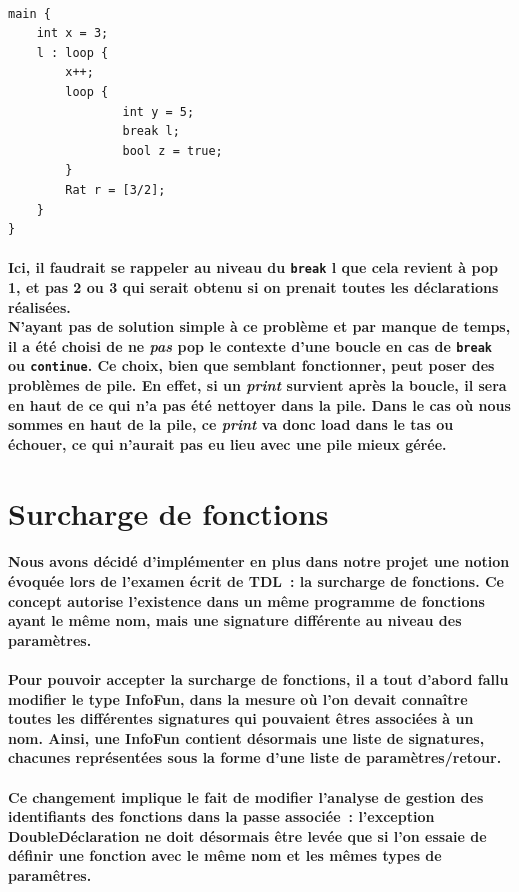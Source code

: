 \documentclass[french]{article}
\begin{document}
\, %
\begin{lstlisting}[language=ratcode]
main {
    int x = 3;
    l : loop {
        x++;
        loop {
                int y = 5;
                break l;
                bool z = true;
        }
        Rat r = [3/2];
    }
}
\end{lstlisting}
\paragraph*{Ici, il faudrait se rappeler au niveau du \texttt{break} l que cela revient à pop 1, et pas 2 ou 3 qui serait obtenu si on prenait toutes les déclarations réalisées.\\
N'ayant pas de solution simple à ce problème et par manque de temps, il a été choisi de ne \emph{pas} pop le contexte d'une boucle en cas de \texttt{break} ou \texttt{continue}.
Ce choix, bien que semblant fonctionner, peut poser des problèmes de pile. En effet, si un \emph{print} survient après la boucle, il sera en haut de ce qui n'a pas été nettoyer dans la pile.
Dans le cas où nous sommes en haut de la pile, ce \emph{print} va donc load dans le tas ou échouer, ce qui n'aurait pas eu lieu avec une pile mieux gérée.}

\section{Surcharge de fonctions}
\paragraph{Nous avons décidé d'implémenter en plus dans notre projet une notion évoquée lors de l'examen écrit de TDL~: la surcharge de fonctions.
Ce concept autorise l'existence dans un même programme de fonctions ayant le même nom, mais une signature différente au niveau des paramètres.}
\paragraph{Pour pouvoir accepter la surcharge de fonctions, il a tout d'abord fallu modifier le type InfoFun, dans la mesure où l'on devait connaître 
toutes les différentes signatures qui pouvaient êtres associées à un nom. Ainsi, une InfoFun contient désormais une liste de signatures, chacunes représentées sous
la forme d'une liste de paramètres/retour.}
\paragraph{Ce changement implique le fait de modifier l'analyse de gestion des identifiants des fonctions dans la passe associée~: l'exception DoubleDéclaration
ne doit désormais être levée que si l'on essaie de définir une fonction avec le même nom et les mêmes types de paramêtres.}
\end{document}
